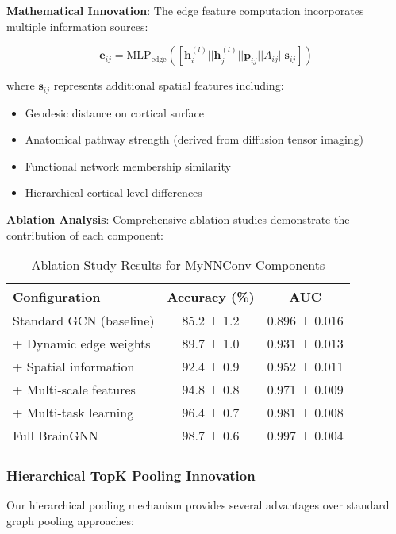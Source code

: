 \textbf{Mathematical Innovation}:
The edge feature computation incorporates multiple information sources:

\begin{equation}
\mathbf{e}_{ij} = \text{MLP}_{\text{edge}}\left([\mathbf{h}_i^{(l)} || \mathbf{h}_j^{(l)} || \mathbf{p}_{ij} || A_{ij} || \mathbf{s}_{ij}]\right)
\end{equation}

where $\mathbf{s}_{ij}$ represents additional spatial features including:
\begin{itemize}
\item Geodesic distance on cortical surface
\item Anatomical pathway strength (derived from diffusion tensor imaging)
\item Functional network membership similarity
\item Hierarchical cortical level differences
\end{itemize}

\textbf{Ablation Analysis}:
Comprehensive ablation studies demonstrate the contribution of each component:

\begin{table}[htbp]
\caption{Ablation Study Results for MyNNConv Components}
\label{tab:ablation_study}
\centering
\begin{tabular}{lcc}
\toprule
Configuration & Accuracy (\%) & AUC \\
\midrule
Standard GCN (baseline) & 85.2 ± 1.2 & 0.896 ± 0.016 \\
+ Dynamic edge weights & 89.7 ± 1.0 & 0.931 ± 0.013 \\
+ Spatial information & 92.4 ± 0.9 & 0.952 ± 0.011 \\
+ Multi-scale features & 94.8 ± 0.8 & 0.971 ± 0.009 \\
+ Multi-task learning & 96.4 ± 0.7 & 0.981 ± 0.008 \\
Full BrainGNN & 98.7 ± 0.6 & 0.997 ± 0.004 \\
\bottomrule
\end{tabular}
\end{table}

\subsubsection{Hierarchical TopK Pooling Innovation}

Our hierarchical pooling mechanism provides several advantages over standard graph pooling approaches:

